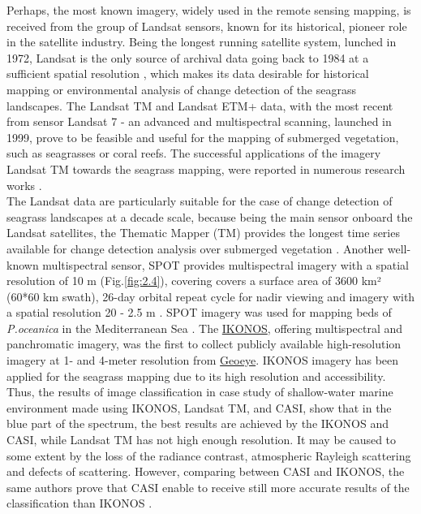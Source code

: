 \documentclass[11pt]{article}
\begin{document}
Perhaps, the most known imagery, widely used in the remote sensing mapping, is received from the
group of Landsat sensors, known for its historical, pioneer role in the satellite industry.
Being the longest running satellite system, lunched in 1972, Landsat is the only source of archival
data going back to 1984 at a sufficient spatial resolution \cite{Dekker05b}\label{Dekker05b}, which makes its data
desirable for historical mapping or environmental analysis of change detection of the seagrass
landscapes.
The \ac{Landsat TM} and \ac{Landsat ETM+} data, with the most recent from sensor Landsat 7 - an advanced
and multispectral scanning, launched in 1999, prove to be feasible and useful for the mapping of
submerged vegetation, such as seagrasses or coral reefs. The successful applications of the imagery
\ac{Landsat TM} towards the seagrass mapping, were reported in numerous research works \cite{Palandro03,Gullstroom06,Wabnitz08,Bierwirth93,Ferguson97,Rasib97}\label{Palandro03}\label{Gullstroom06}\label{Wabnitz08}\label{Bierwirth93}\label{Ferguson97}\label{Rasib97}.\\ The Landsat data are particularly suitable for the
case of change detection of seagrass landscapes at a decade scale, because being the main sensor
onboard the Landsat satellites, the Thematic Mapper (TM) provides the longest time series
available for change detection analysis over submerged vegetation \cite{Palandro03}\label{Palandro03}.
Another well-known multispectral sensor, \ac{SPOT} provides multispectral imagery with a spatial resolution of 10 m (Fig.\ref{fig:2.4}), covering covers a surface area of 3600 km² (60*60 km swath), 26-day
orbital repeat cycle for nadir viewing and imagery with a spatial resolution 20 - 2.5 m
\cite{SPOT}\label{SPOT}. \ac{SPOT} imagery was used for mapping beds of \textit{P.oceanica} in the
Mediterranean Sea \cite{Pasqualini05} \label{Pasqualini05}. 
The \href{http://www.satimagingcorp.com/gallery-ikonos.html}{IKONOS}, offering multispectral and panchromatic imagery, was the first to collect publicly
available high-resolution imagery at 1- and 4-meter resolution from \href{http://www.geoeye.com}{Geoeye}. IKONOS
imagery has been applied for the seagrass mapping due to its high resolution and accessibility. 
Thus, the results of image classification in case study of shallow-water marine environment \cite{Mumby02}\label{Mumby02}
made using IKONOS, \ac{Landsat TM}, and \ac{CASI}, show that in the blue part of the
spectrum, the best results are achieved by the IKONOS and \ac{CASI}, while \ac{Landsat TM} has not high
enough resolution. 
It may be caused to some extent by the loss of the radiance contrast, atmospheric
Rayleigh scattering and defects of scattering. However, comparing between CASI and IKONOS, the
same authors prove that \ac{CASI} enable to receive still more accurate results of the classification
than IKONOS \cite{Mumby02}\label{Mumby02}.
\end{document}

